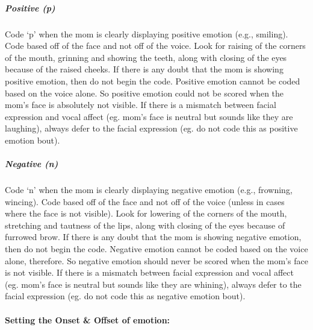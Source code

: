 \documentclass[
  12pt,
]{book}
\begin{document}
\hypertarget{mom_pos_emo}{%
\subparagraph*{Positive (p)}\label{mom_pos_emo}}

Code `p' when the mom is clearly displaying positive emotion (e.g., smiling). Code based off of the face and not off of the voice. Look for raising of the corners of the mouth, grinning and showing the teeth, along with closing of the eyes because of the raised cheeks. If there is any doubt that the mom is showing positive emotion, then do not begin the code.
Positive emotion cannot be coded based on the voice alone. So positive emotion could not be scored when the mom's face is absolutely not visible. If there is a mismatch between facial expression and vocal affect (eg. mom's face is neutral but sounds like they are laughing), always defer to the facial expression (eg. do not code this as positive emotion bout).

\hypertarget{mom_neg_emo}{%
\subparagraph*{Negative (n)}\label{mom_neg_emo}}

Code `n' when the mom is clearly displaying negative emotion (e.g., frowning, wincing). Code based off of the face and not off of the voice (unless in cases where the face is not visible). Look for lowering of the corners of the mouth, stretching and tautness of the lips, along with closing of the eyes because of furrowed brow. If there is any doubt that the mom is showing negative emotion, then do not begin the code.
Negative emotion cannot be coded based on the voice alone, therefore. So negative emotion should never be scored when the mom's face is not visible. If there is a mismatch between facial expression and vocal affect (eg. mom's face is neutral but sounds like they are whining), always defer to the facial expression (eg. do not code this as negative emotion bout).

\hypertarget{setting-the-onset-offset-of-emotion-2}{%
\paragraph{Setting the Onset \& Offset of emotion:}\label{setting-the-onset-offset-of-emotion-2}}
\end{document}

